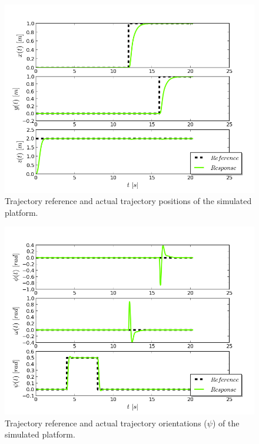 \begin{figure}[H]
\centering
\includegraphics[scale=0.7]{Images/Chapter5/ardrone/position_control.png}
\caption{Trajectory reference and actual trajectory positions of the simulated platform.}
\label{fig:ardrone_pos}
\end{figure}

\begin{figure}[H]
\centering
\includegraphics[scale=0.7]{Images/Chapter5/ardrone/euler_angle_control.png}
\caption{Trajectory reference and actual trajectory orientations ($\psi$) of the simulated platform.}
\label{fig:ardrone_ang}
\end{figure}

